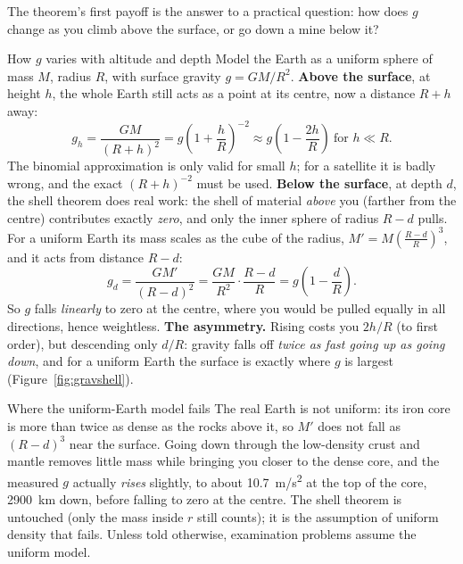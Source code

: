 The theorem's first payoff is the answer to a practical question: how does $g$ change as you climb above
the surface, or go down a mine below it?

\begin{derivbox}{How $g$ varies with altitude and depth}
Model the Earth as a uniform sphere of mass $M$, radius $R$, with surface gravity $g=GM/R^2$.
 \textbf{Above the surface}, at height $h$, the whole Earth still acts as a point at its centre,
now a distance $R+h$ away:
\[
g_h=\frac{GM}{(R+h)^2}=g\left(1+\frac{h}{R}\right)^{-2}\approx g\left(1-\frac{2h}{R}\right)\ \text{for }h\ll R.
\]
The binomial approximation is only valid for small $h$; for a satellite it is badly wrong, and the exact
$(R+h)^{-2}$ must be used.
 \textbf{Below the surface}, at depth $d$, the shell theorem does real work: the shell of
material \emph{above} you (farther from the centre) contributes exactly \emph{zero}, and only the inner
sphere of radius $R-d$ pulls. For a uniform Earth its mass scales as the cube of the radius,
$M'=M\left(\frac{R-d}{R}\right)^3$, and it acts from distance $R-d$:
\[
g_d=\frac{GM'}{(R-d)^2}=\frac{GM}{R^2}\cdot\frac{R-d}{R}=g\left(1-\frac{d}{R}\right).
\]
So $g$ falls \emph{linearly} to zero at the centre, where you would be pulled equally in all
directions, hence weightless.
 \textbf{The asymmetry.} Rising costs you $2h/R$ (to first order), but descending only $d/R$:
gravity falls off \emph{twice as fast going up as going down}, and for a uniform Earth the surface is
exactly where $g$ is largest (Figure~\ref{fig:gravshell}).
\end{derivbox}

\begin{remarkbox}{Where the uniform-Earth model fails}
The real Earth is not uniform: its iron core is more than twice as dense as the rocks above it, so
$M'$ does not fall as $(R-d)^3$ near the surface. Going down through the low-density crust and mantle
removes little mass while bringing you closer to the dense core, and the measured $g$ actually
\emph{rises} slightly, to about \SI{10.7}{m/s^2} at the top of the core, \SI{2900}{km} down, before
falling to zero at the centre. The shell theorem is untouched (only the mass inside $r$ still counts);
it is the assumption of uniform density that fails. Unless told otherwise, examination problems assume
the uniform model.
\end{remarkbox}

\begin{figure}[htbp]
\centering
{}
\end{figure}

